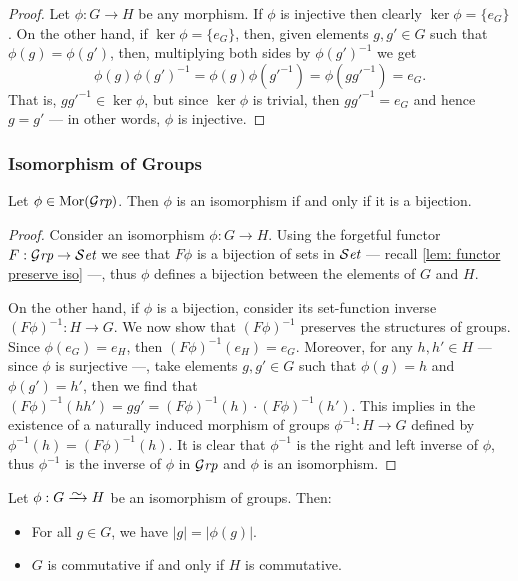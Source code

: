 \begin{proof}
  Let \(\phi: G \to H\) be any morphism. If \(\phi\) is injective then clearly
  \(\ker\phi = \{e_G\}\). On the other hand, if \(\ker\phi = \{e_G\}\), then,
  given elements \(g, g' \in G\) such that \(\phi(g) = \phi(g')\), then,
  multiplying both sides by \(\phi(g')^{-1}\) we get
  \[
    \phi(g)\phi(g')^{-1} = \phi(g) \phi(g'^{-1}) = \phi(gg'^{-1}) = e_G.
  \]
  That is, \(gg'^{-1} \in \ker\phi\), but since \(\ker\phi\) is trivial, then
  \(gg'^{-1} = e_G\) and hence \(g = g'\) --- in other words, \(\phi\) is
  injective.
\end{proof}

\subsubsection{Isomorphism of Groups}

\begin{proposition}\label{prop: grp-iso-bij}
  Let \(\phi \in \operatorname{Mor}({\mathcal{G}\textit{rp}})\). Then \(\phi\) is an isomorphism if and only if it
  is a bijection.
\end{proposition}

\begin{proof}
  Consider an isomorphism \(\phi: G \to H\). Using the forgetful functor \(F:
  {\mathcal{G}\textit{rp}} \to {\mathcal{S}\textit{et}}\) we see that \(F\phi\) is a bijection of sets in \({\mathcal{S}\textit{et}}\) ---
  recall \cref{lem: functor preserve iso} ---, thus \(\phi\) defines a bijection
  between the elements of \(G\) and \(H\).

  On the other hand, if \(\phi\) is a bijection, consider its set-function
  inverse \((F\phi)^{-1}: H \to G\). We now show that \((F\phi)^{-1}\) preserves
  the structures of groups. Since \(\phi(e_G) = e_H\), then \((F\phi)^{-1}(e_H)
  = e_G\). Moreover, for any \(h, h' \in H\) --- since \(\phi\) is surjective
  ---, take elements \(g, g' \in G\) such that \(\phi(g) = h\) and \(\phi(g') =
  h'\), then we find that \((F\phi)^{-1}(hh') = g g' = (F\phi)^{-1}(h) \cdot
  (F\phi)^{-1}(h')\). This implies in the existence of a naturally induced
  morphism of groups \(\phi^{-1}: H \to G\) defined by \(\phi^{-1}(h) =
  (F\phi)^{-1}(h)\). It is clear that \(\phi^{-1}\) is the right and left
  inverse of \(\phi\), thus \(\phi^{-1}\) is the inverse of \(\phi\) in \({\mathcal{G}\textit{rp}}\)
  and \(\phi\) is an isomorphism.
\end{proof}

\begin{proposition}\label{prop: iso-order-com}
  Let \(\phi: G \isoto H\) be an isomorphism of groups. Then:
  \begin{itemize}
    \setlength\itemsep{0em}
    \item For all \(g \in G\), we have \(|g| = |\phi(g)|\).
    \item \(G\) is commutative if and only if \(H\) is commutative.
  \end{itemize}
\end{proposition}

